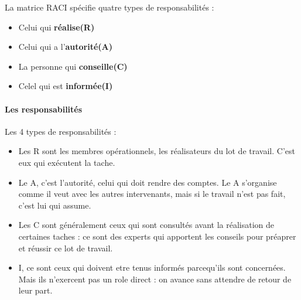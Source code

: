 La matrice RACI spécifie quatre types de responsabilités : 
\begin{itemize}
	\item Celui qui \textbf{réalise(R)}
	\item Celui qui a l'\textbf{autorité(A)}
	\item La personne qui \textbf{conseille(C)}
	\item Celel qui est \textbf{informée(I)}
\end{itemize}
\paragraph*{Les responsabilités}
Les 4 types de responsabilités :
\begin{itemize}
	\item Les R sont les membres opérationnels, les réalisateurs du lot de travail. C'est eux qui exécutent la tache.
	\item Le A, c'est l'autorité, celui qui doit rendre des comptes. Le A s'organise comme il veut avec les autres intervenants, mais si le travail n'est pas fait, c'est lui qui assume.
	\item Les C sont généralement ceux qui sont consultés avant la réalisation de certaines taches : ce sont des experts qui apportent les conseils pour préaprer et réussir ce lot de travail.
	\item I, ce sont ceux qui doivent etre tenus informés parcequ'ils sont concernées. Mais ils n'exercent pas un role direct : on avance sans attendre de retour de leur part.
\end{itemize}
